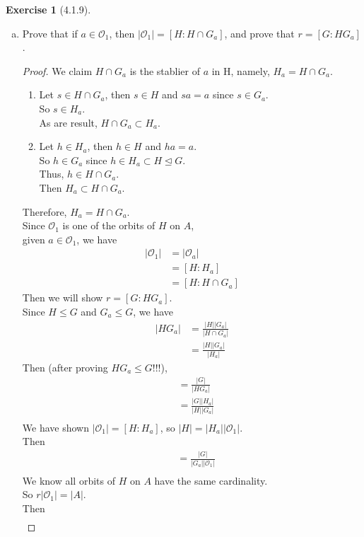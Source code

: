 \documentclass{amsart}
\theoremstyle{plain}
\theoremstyle{definition}
\newtheorem{exer}[lem]{Exercise}
\newcommand{\OO}[1]{\mathcal{O}_{#1}}
\begin{document}
\begin{exer}[4.1.9]
\begin{enumerate}[(a)]
\item
Prove that if $a\in\OO 1$, then $|\OO 1|=[H\colon H\cap G_a]$, and prove that $r=[G\colon HG_a]$. 
\begin{proof}
We claim $H\cap G_a$ is the stablier of $a$ in H, namely, $H_a = H \cap G_a$.\\
\begin{enumerate}
	\item
Let $s \in H \cap G_a$, then $s \in H$ and $sa = a$ since $s \in G_a$.\\
So $s \in H_a$. \\
As are result, $H \cap G_a \subset H_a$.
\item
Let $h \in H_a$, then $h \in H$ and $ha = a$.\\
So $h \in G_a$ since $h \in H_a \subset H \unlhd G$.\\
Thus, $h \in H \cap G_a$.\\
Then $H_a \subset H \cap G_a$.
\end{enumerate}
Therefore, $H_a =H \cap G_a$.\\
Since $\OO{1}$ is one of the orbits of $H$ on $A$,\\
given $a \in \OO 1$, we have 
\begin{align*}
  |\OO 1| &= |\OO a|\\ 
  		 	  	&= [H:H_a] \\
  			 	&=[H:H\cap G_a]
\end{align*}
Then we will show $r=[G:HG_a]$. \\
Since $H\leq G$ and $G_a\leq G$, we have 
\begin{align*}
 	|HG_a| &= \frac{|H||G_a|}{|H\cap G_a|} \\
  		   	 &= \frac{|H||G_a|}{|H_a|} 
\end{align*}
Then (after proving $HG_a \leq G$!!!),
\begin{align*}
  [G:HG_a] &= \frac{|G|}{|HG_a|} \\
  		   &= \frac{|G||H_a|}{|H||G_a|} \\
\end{align*}
We have shown $|\OO 1|  = [H:H_a]$, so $|H|=|H_a||\OO 1|$.\\
Then
\begin{align*}
  [G:HG_a] &= \frac{|G|}{|G_a||\OO 1|} \\
\end{align*}
We know all orbits of $H$ on $A$ have the same cardinality. \\
So $r|\OO 1| = |A|$.\\
Then 
\begin{align*}

\end{align*}
\end{proof}
\end{enumerate}
\end{exer}
\end{document}
